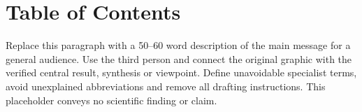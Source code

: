 \documentclass[a4paper,11pt]{article}
\begin{document}
\section*{Table of Contents}
\begin{center}
\begingroup
\setlength{\fboxsep}{0pt}
\endgroup
\end{center}
Replace this paragraph with a 50--60 word description of the main message
for a general audience. Use the third person and connect the original
graphic with the verified central result, synthesis or viewpoint. Define
unavoidable specialist terms, avoid unexplained abbreviations and remove
all drafting instructions. This placeholder conveys no scientific finding
or claim.
\end{document}
